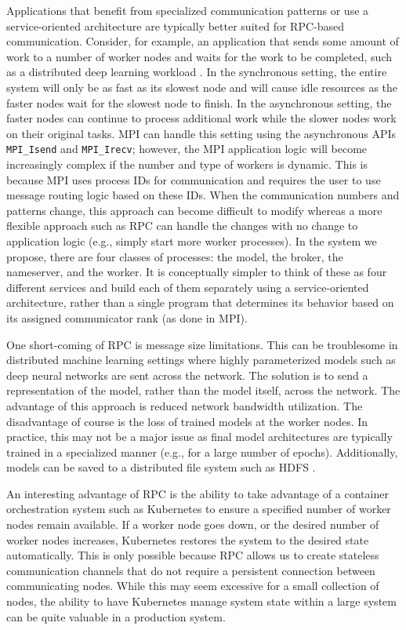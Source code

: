 \documentclass[conference]{IEEEtran}
\begin{document}
Applications that benefit from specialized communication patterns or
use a service-oriented architecture are typically better
suited for RPC-based communication. Consider, for example, an application that
sends some amount of work to a number of worker nodes and waits for the work
to be completed, such as a distributed deep learning workload \cite{40565}. In the
synchronous setting, the entire system will only be as fast as its slowest node
and will cause idle resources as the faster nodes wait for the slowest node to
finish. In the asynchronous setting, the faster nodes can continue to process
additional work while the slower nodes work on their original tasks. MPI can
handle this setting using the asynchronous APIs \texttt{MPI\_Isend}
and \texttt{MPI\_Irecv}; however, the MPI application logic will become increasingly
complex if the number and type of workers is dynamic. This is because MPI uses
process IDs for communication and requires the user to use message routing logic
based on these IDs. When the communication numbers and patterns change, this
approach can become difficult to modify whereas a more flexible approach such
as RPC can handle the changes with no change to application logic (e.g., simply
start more worker processes). In the system we propose,
there are four classes of processes: the model, the broker, the nameserver, and
the worker. It is conceptually simpler to think of these as four different
services and build each of them separately using a service-oriented
architecture, rather than a single program that determines its behavior based on
its assigned communicator rank (as done in MPI).

One short-coming of RPC is message size limitations. This can be
troublesome in distributed machine learning settings where highly parameterized
models such as deep neural networks are sent across the network. The solution
is to send a representation of the model, rather than the model itself, across
the network. The advantage of this approach is reduced network bandwidth
utilization. The disadvantage of course is the loss of trained models at the
worker nodes. In practice, this may not be a major issue as final model
architectures are typically trained in a specialized manner (e.g., for a large
number of epochs). Additionally, models can be saved to a distributed file system
such as HDFS \cite{Shvachko:2010:HDF:1913798.1914427}.

An interesting advantage of RPC is the ability to take advantage of a container
orchestration system such as Kubernetes \cite{43826} to ensure a specified
number of worker nodes remain available. If a worker node goes down, or the
desired number of worker nodes increases, Kubernetes restores the system to
the desired state automatically. This is only possible because RPC allows us to
create stateless communication channels that do not require a persistent connection
between communicating nodes. While this may seem excessive for a small collection
of nodes, the ability to have Kubernetes manage system state within a large
system can be quite valuable in a production system.
\end{document}
